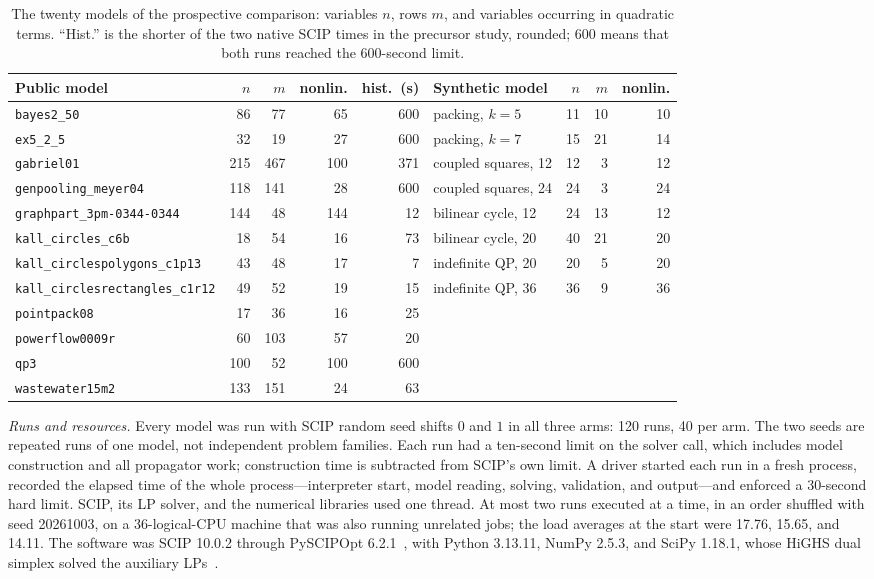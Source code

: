 \begin{table}[htbp]
\centering
\footnotesize
\setlength{\tabcolsep}{4pt}
\begin{tabular}{@{}lrrrr@{\quad}lrrr@{}}
\toprule
Public model & $n$ & $m$ & nonlin. & hist.\ (s) & Synthetic model & $n$ & $m$ & nonlin.\\
\midrule
\texttt{bayes2\_50} & 86 & 77 & 65 & 600 & packing, $k=5$ & 11 & 10 & 10\\
\texttt{ex5\_2\_5} & 32 & 19 & 27 & 600 & packing, $k=7$ & 15 & 21 & 14\\
\texttt{gabriel01} & 215 & 467 & 100 & 371 & coupled squares, 12 & 12 & 3 & 12\\
\texttt{genpooling\_meyer04} & 118 & 141 & 28 & 600 & coupled squares, 24 & 24 & 3 & 24\\
\texttt{graphpart\_3pm-0344-0344} & 144 & 48 & 144 & 12 & bilinear cycle, 12 & 24 & 13 & 12\\
\texttt{kall\_circles\_c6b} & 18 & 54 & 16 & 73 & bilinear cycle, 20 & 40 & 21 & 20\\
\texttt{kall\_circlespolygons\_c1p13} & 43 & 48 & 17 & 7 & indefinite QP, 20 & 20 & 5 & 20\\
\texttt{kall\_circlesrectangles\_c1r12} & 49 & 52 & 19 & 15 & indefinite QP, 36 & 36 & 9 & 36\\
\texttt{pointpack08} & 17 & 36 & 16 & 25 & & & & \\
\texttt{powerflow0009r} & 60 & 103 & 57 & 20 & & & & \\
\texttt{qp3} & 100 & 52 & 100 & 600 & & & & \\
\texttt{wastewater15m2} & 133 & 151 & 24 & 63 & & & & \\
\bottomrule
\end{tabular}
\caption{The twenty models of the prospective comparison: variables $n$,
rows $m$, and variables occurring in quadratic terms. ``Hist.'' is the
shorter of the two native SCIP times in the precursor study, rounded; 600
means that both runs reached the 600-second limit.}
\label{tab:cohort}
\end{table}

\emph{Runs and resources.} Every model was run with SCIP random seed shifts $0$
and $1$ in all three arms: 120 runs, 40 per arm. The two seeds are repeated runs
of one model, not independent problem families. Each run had a ten-second limit
on the solver call, which includes model construction and all propagator work;
construction time is subtracted from SCIP's own limit. A driver started each run
in a fresh process, recorded the elapsed time of the whole process---interpreter
start, model reading, solving, validation, and output---and enforced a
30-second hard limit. SCIP, its LP solver, and the numerical libraries used one
thread. At most two runs executed at a time, in an order shuffled with seed
20261003, on a 36-logical-CPU machine that was also running unrelated jobs; the
load averages at the start were 17.76, 15.65, and 14.11. The software was SCIP
10.0.2 through PySCIPOpt 6.2.1~\cite{maher2016-pyscipopt-mathematical-programming-in-python},
with Python 3.13.11, NumPy 2.5.3, and SciPy 1.18.1, whose HiGHS dual simplex
solved the auxiliary LPs~\cite{huangfu2018-parallelizing-the-dual-revised-simplex}.

